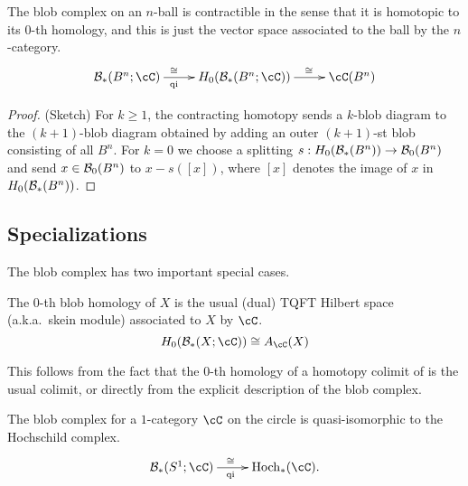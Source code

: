 \documentclass{pnastwo}
\begin{document}
\begin{article}
\begin{property}[Contractibility]
\label{property:contractibility}%
The blob complex on an $n$-ball is contractible in the sense 
that it is homotopic to its $0$-th homology, and this is just the vector space associated to the ball by the $n$-category.
\begin{equation*}
\xymatrix{\bc_*(B^n;\cC) \ar[r]^(0.4){\iso}_(0.4){\text{qi}} & H_0(\bc_*(B^n;\cC)) \ar[r]^(0.6)\iso & \cC(B^n)}
\end{equation*}
\end{property}

\begin{proof}(Sketch)
For $k\ge 1$, the contracting homotopy sends a $k$-blob diagram to the $(k{+}1)$-blob diagram
obtained by adding an outer $(k{+}1)$-st blob consisting of all $B^n$.
For $k=0$ we choose a splitting $s: H_0({\mathcal B}_*(B^n)) \to {\mathcal B}_0(B^n)$ and send 
$x\in {\mathcal B}_0(B^n)$ to $x - s([x])$, where $[x]$ denotes the image of $x$ in $H_0({\mathcal B}_*(B^n))$.
\end{proof}

\subsection{Specializations}
\label{sec:specializations}

The blob complex has two important special cases.

\begin{thm}
\label{thm:skein-modules}
The $0$-th blob homology of $X$ is the usual 
(dual) TQFT Hilbert space (a.k.a.\ skein module) associated to $X$
by $\cC$.
\begin{equation*}
H_0(\bc_*(X;\cC)) \iso A_{\cC}(X)
\end{equation*}
\end{thm}
This follows from the fact that the $0$-th homology of a homotopy colimit of  is the usual colimit, or directly from the explicit description of the blob complex.

\begin{thm}[Hochschild homology when $X=S^1$]
\label{thm:hochschild}
The blob complex for a $1$-category $\cC$ on the circle is
quasi-isomorphic to the Hochschild complex.
\begin{equation*}
\xymatrix{\bc_*(S^1;\cC) \ar[r]^(0.47){\iso}_(0.47){\text{qi}} & \HC_*(\cC).}
\end{equation*}
\end{thm}


\end{article}
\end{document}
